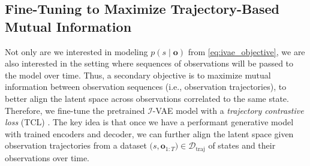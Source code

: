 \subsection{Fine-Tuning to Maximize Trajectory-Based Mutual Information}
Not only are we interested in modeling $p(s \mid \mathbf{o})$ from \cref{eq:ivae_objective}, we are also interested in the setting where sequences of observations will be passed to the model over time.
Thus, a secondary objective is to maximize mutual information between observation sequences (i.e., observation trajectories), to better align the latent space across observations correlated to the same state.
Therefore, we fine-tune the pretrained $\mathcal{I}$-VAE model with a \textit{trajectory contrastive loss} (TCL) \cite{oord2018representation,halawa2022action,zheng2023taco}.
The key idea is that once we have a performant generative model with trained encoders and decoder, we can further align the latent space given observation trajectories from a dataset $\big(s,\mathbf{o}_{1:T}\big) \in \mathcal{D}_\text{traj}$ of states and their observations over time.

